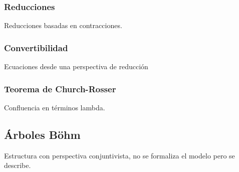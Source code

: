 \subsubsection{Reducciones}
\label{sec:reducciones}

Reducciones basadas en contracciones.

\subsubsection{Convertibilidad}
\label{sec:convertibilidad}

Ecuaciones desde una perspectiva de reducción

\subsubsection{Teorema de Church-Rosser}
\label{sec:church-rosser}

Confluencia en términos lambda.

\subsection{Árboles Böhm}
\label{sec:arboles-bohm}

Estructura con perspectiva conjuntivista, no se formaliza el modelo pero se describe.

